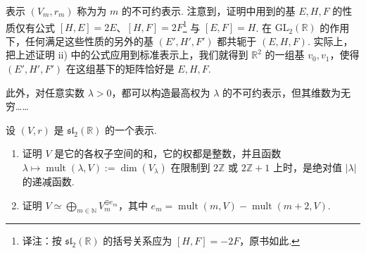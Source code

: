 \begin{remark*}
表示 $(V_m,r_m)$ 称为为 $m$ 的不可约表示. 注意到，证明中用到的基 $E,H,F$ 的性质仅有公式 $[H,E]=2E$、$[H,F]=2F$\footnote{译注：按 $\mathfrak{sl}_2(\mathbb R)$ 的括号关系应为 $[H,F]=-2F$，原书如此.} 与 $[E,F]=H$. 在 $\mathrm{GL}_2(\mathbb R)$ 的作用下，任何满足这些性质的另外的基 $(E',H',F')$ 都共轭于 $(E,H,F)$. 实际上，把上述证明 ii) 中的公式应用到标准表示上，我们就得到 $\mathbb R^2$ 的一组基 $v_0,v_1$，使得 $(E',H',F')$ 在这组基下的矩阵恰好是 $E,H,F$.

此外，对任意实数 $\lambda>0$，都可以构造最高权为 $\lambda$ 的不可约表示，但其维数为无穷……
\end{remark*}

\begin{exercise*}
设 $(V,r)$ 是 $\mathfrak{sl}_2(\mathbb R)$ 的一个表示.
\begin{enumerate}[label=\roman*)]
\item 证明 $V$ 是它的各权子空间的和，它的权都是整数，并且函数 $\lambda\mapsto\operatorname{mult}(\lambda,V):=\dim(V_\lambda)$ 在限制到 $2\mathbb Z$ 或 $2\mathbb Z+1$ 上时，是绝对值 $|\lambda|$ 的递减函数.
\item 证明 $V\simeq\bigoplus_{m\in\mathbb N}V_m^{\oplus e_m}$，其中 $e_m=\operatorname{mult}(m,V)-\operatorname{mult}(m+2,V)$.
\end{enumerate}
\end{exercise*}

